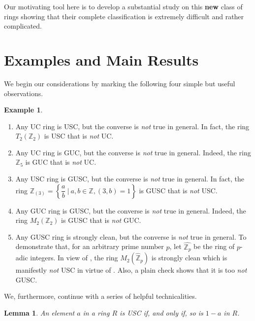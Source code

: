 \documentclass[12pt]{amsart}
\newtheorem{lemma}[theorem]{Lemma}
\theoremstyle{definition}
\newtheorem{example}[theorem]{Example}
\begin{document}
\bigskip

Our motivating tool here is to develop a substantial study on this {\bf new} class of rings showing that their complete classification is extremely difficult and rather complicated.

\section{Examples and Main Results}

We begin our considerations by marking the following four simple but useful observations.

\begin{example}\label{exam1.7}
\begin{enumerate}
\item
Any UC ring is USC, but the converse is {\it not} true in general. In fact, the ring $T_{2}(\mathbb{Z}_{2})$ is USC that is {\it not} UC.

\item
Any UC ring is GUC, but the converse is {\it not} true in general. Indeed, the ring $\mathbb{Z}_{5}$ is GUC that is {\it not} UC.

\item
Any USC ring is GUSC, but the converse is {\it not} true in general. In fact, the ring $\mathbb{Z}_{(3)}=\left\{ \dfrac{a}{b} ~ \Big| ~ a,b \in \mathbb{Z}, (3,b)=1\right\}$ is GUSC that is {\it not} USC.

\item
Any GUC ring is GUSC, but the converse is {\it not} true in general. Indeed, the ring $M_{2}(\mathbb{Z}_{2})$ is GUSC that is {\it not} GUC.

\item
Any GUSC ring is strongly clean, but the converse is {\it not} true in general. To demonstrate that, for an arbitrary prime number $p$, let $\hat{\mathbb{Z}_{p}}$ be the ring of $p$-adic integers. In view of \cite[Theorem 2.4]{10}, the ring $M_{2}(\hat{\mathbb{Z}}_{p})$ is strongly clean which is manifestly {\it not} USC in virtue of \cite[Corollary 7]{2}. Also, a plain check shows that it is too {\it not} GUSC.
\end{enumerate}
\end{example}

We, furthermore, continue with a series of helpful technicalities.

\begin{lemma}\label{lem2.1}
An element $a$ in a ring $R$ is USC if, and only if, so is $1-a$ in $R$.
\end{lemma}
\end{document}
